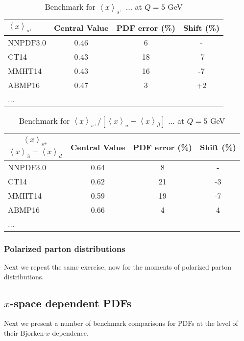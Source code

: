 \begin{table}[t]
\renewcommand{\arraystretch}{1.2} 
\centering
\begin{tabular}{@{}lccc@{}} 
\hline 
\rule[-3 ex]{0pt}{7 ex}  %
$\left\langle x\right\rangle _{s^{+}}$ 
   & Central Value & PDF error (\%) & Shift (\%) \\
\hline 
NNPDF3.0 & 0.46 & 6 & -\\
CT14 & 0.43 & 18 & -7\\
MMHT14 & 0.43 & 16 & -7\\
ABMP16 & 0.47 & 3 & +2\\
... &  &  & \\
\hline 
\end{tabular}

\caption{Benchmark for $\left\langle x\right\rangle _{s^{+}}$ ... at $Q=5$
GeV}
\end{table}

\begin{table}[t]
\renewcommand{\arraystretch}{1.2} 
\centering
\begin{tabular}{@{}lccc@{}}
\hline 
\rule[-3 ex]{0pt}{7 ex}  %
$\dfrac{\left\langle x\right\rangle _{s^{+}}}{\left\langle x\right\rangle _{\bar{u}}-\left\langle x\right\rangle _{\bar{d}}}$ 
   & Central Value & PDF error (\%) & Shift (\%)\\
\hline 
NNPDF3.0 & 0.64 & 8 & -\\
CT14 & 0.62 & 21 & -3\\
MMHT14 & 0.59 & 19 & -7\\
ABMP16 & 0.66 & 4 & 4\\
... &  &  & \\
\hline 
\end{tabular}
\caption{Benchmark for $\left\langle x\right\rangle _{s^{+}}/\left[\left\langle x\right\rangle _{\bar{u}}-\left\langle x\right\rangle _{\bar{d}}\right]$
... at $Q=5$ GeV}
\end{table}



\subsubsection{Polarized parton distributions}

Next we repeat the same exercise, now for the moments
of polarized parton distributions.

\subsection{$x$-space dependent PDFs}

Next we present a number of benchmark comparisons for
PDFs at the level of their Bjorken-$x$
dependence.
